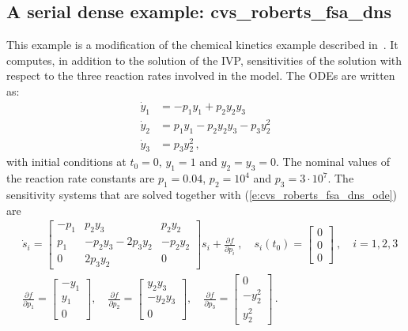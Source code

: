 

\subsection{A serial dense example: cvs\_roberts\_fsa\_dns}
\label{ss:cvs_roberts_fsa_dns}

This example is a modification of the chemical kinetics example 
described in~\cite{cvode_ex}.  It computes, in addition to the solution of the
IVP, sensitivities of the solution with respect to the three reaction rates 
involved in the model. The ODEs are written as:
\begin{equation}\label{e:cvs_roberts_fsa_dns_ode}
  \begin{split}
    {\dot y}_1 &= -p_1 y_1 + p_2 y_2 y_3   \\
    {\dot y}_2 &=  p_1 y_1 - p_2 y_2 y_3 - p_3 y_2^2 \\
    {\dot y}_3 &=  p_3 y_2^2 \, ,
  \end{split}
\end{equation}
with initial conditions at $t_0 = 0$, $y_1 = 1$ and $y_2 = y_3 = 0$. 
The nominal values of the reaction rate constants are 
$p_1 = 0.04$, $p_2 = 10^4$ and $p_3 = 3\cdot 10^7$.
The sensitivity systems that are solved together with (\ref{e:cvs_roberts_fsa_dns_ode}) are
\begin{equation}\label{e:cvs_roberts_fsa_dns_sens}
  \begin{split}
    & {\dot s}_i = 
    \begin{bmatrix}
      - p_1 &   p_2 y_3             &   p_2 y_2 \\
        p_1 & - p_2 y_3 - 2 p_3 y_2 & - p_2 y_2 \\
        0   &             2 p_3 y_2 &  0              
    \end{bmatrix}
    s_i + \frac{\partial f}{\partial p_i} ~,
    \quad s_i(t_0) = \begin{bmatrix} 0 \\ 0 \\ 0 \end{bmatrix}  ~,
    \quad i = 1,2,3 \\
    & \frac{\partial f}{\partial p_1} = \begin{bmatrix} -y_1 \\ y_1 \\ 0 \end{bmatrix}, \quad
    \frac{\partial f}{\partial p_2} = \begin{bmatrix} y_2 y_3 \\ -y_2 y_3 \\ 0 \end{bmatrix}, \quad
    \frac{\partial f}{\partial p_3} = \begin{bmatrix} 0 \\ - y_2^2 \\ y_2^2 \end{bmatrix} \, .
  \end{split}
\end{equation}


